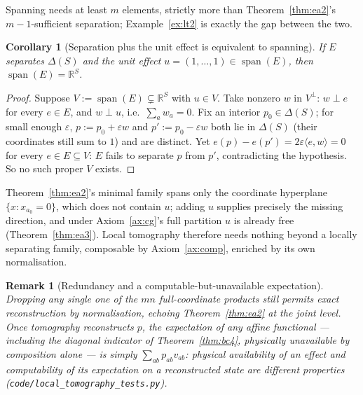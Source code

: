 \documentclass[11pt,a4paper]{article}
\newtheorem{corollary}[theorem]{Corollary}
\newtheorem{remark}[theorem]{Remark}
\begin{document}
    Spanning needs at least $m$ elements, strictly more than Theorem~\ref{thm:ea2}'s $m-1$-sufficient
    separation; Example~\ref{ex:lt2} is exactly the gap between the two.

    \begin{corollary}[Separation plus the unit effect is equivalent to spanning]
      \label{cor:lt3corollary}
      If $E$ separates $\Delta(S)$ and the unit effect $u = (1,\dots,1) \in \operatorname{span}(E)$, then
      $\operatorname{span}(E) = \mathbb{R}^S$.
    \end{corollary}

    \begin{proof}
      Suppose $V := \operatorname{span}(E) \subsetneq \mathbb{R}^S$ with $u \in V$.
      Take nonzero $w$ in $V^\perp$: $w \perp e$ for every $e \in E$, and $w \perp u$, i.e.\
      $\sum_a w_a = 0$.
      Fix an interior $p_0 \in \Delta(S)$; for small enough $\varepsilon$, $p := p_0 + \varepsilon w$ and
      $p' := p_0 - \varepsilon w$ both lie in $\Delta(S)$ (their coordinates still sum to $1$) and are
      distinct.
      Yet $e(p) - e(p') = 2\varepsilon \langle e, w \rangle = 0$ for every $e \in E \subseteq V$: $E$ fails to
      separate $p$ from $p'$, contradicting the hypothesis.
      So no such proper $V$ exists.
    \end{proof}

    Theorem~\ref{thm:ea2}'s minimal family spans only the coordinate hyperplane $\{x : x_{a_0} = 0\}$, which
    does not contain $u$; adding $u$ supplies precisely the missing direction, and under Axiom~\ref{ax:cg}'s
    full partition $u$ is already free (Theorem~\ref{thm:ea3}).
    Local tomography therefore needs nothing beyond a locally separating family, composable by
    Axiom~\ref{ax:comp}, enriched by its own normalisation.

    \begin{remark}[Redundancy and a computable-but-unavailable expectation]
      \label{rem:lt5lt6}
      Dropping any single one of the $mn$ full-coordinate products still permits exact reconstruction by
      normalisation, echoing Theorem~\ref{thm:ea2} at the joint level.
      Once tomography reconstructs $p$, the expectation of \emph{any} affine functional --- including the
      diagonal indicator of Theorem~\ref{thm:bc4}, physically unavailable by composition alone --- is simply
      $\sum_{ab} p_{ab} v_{ab}$: physical availability of an effect and computability of its expectation on a
      reconstructed state are different properties (\texttt{code/local\_tomography\_tests.py}).
    \end{remark}
\end{document}
